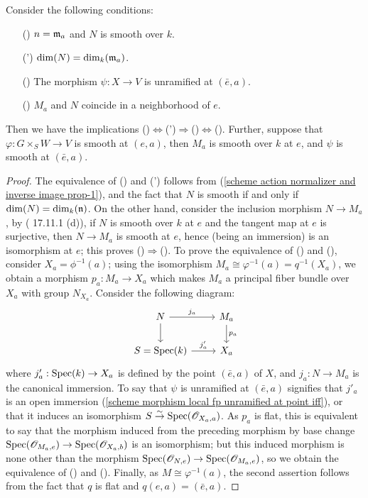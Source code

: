 \begin{lemma}\label{scheme action normalizer and inverse image prop}
Consider the following conditions:
\begin{enumerate}
    \item[(\rmnum{1})] $n=\mathfrak{m}_a$ and $N$ is smooth over $k$.
    \item[(\rmnum{1}')] $\dim(N)=\dim_k(\mathfrak{m}_a)$.
    \item[(\rmnum{2})] The morphism $\psi:X\to V$ is unramified at $(\bar{e},a)$.
    \item[(\rmnum{3})] $M_a$ and $N$ coincide in a neighborhood of $e$.  
\end{enumerate}
Then we have the implications ()$\Leftrightarrow$(')$\Rightarrow$()$\Leftrightarrow$(). Further, suppose that $\varphi:G\times_SW\to V$ is smooth at $(e,a)$, then $M_a$ is smooth over $k$ at $e$, and $\psi$ is smooth at $(\bar{e},a)$.
\end{lemma}
\begin{proof}
The equivalence of () and (') follows from (\ref{scheme action normalizer and inverse image prop-1}), and the fact that $N$ is smooth if and only if $\dim(N)=\dim_k(\mathfrak{n})$. On the other hand, consider the inclusion morphism $N\to M_a$, by (\cite{EGA4-4} 17.11.1 (d)), if $N$ is smooth over $k$ at $e$ and the tangent map at $e$ is surjective, then $N\to M_a$ is smooth at $e$, hence (being an immersion) is an isomorphism at $e$; this proves ()$\Rightarrow$(). To prove the equivalence of () and (), consider $X_a=\phi^{-1}(a)$; using the isomorphism $M_a\cong\varphi^{-1}(a)=q^{-1}(X_a)$, we obtain a morphism $p_a:M_a\to X_a$ which makes $M_a$ a principal fiber bundle over $X_a$ with group $N_{X_a}$. Consider the following diagram:
\[\begin{tikzcd}
N\ar[r,"j_a"]\ar[d]&M_a\ar[d,"p_a"]\\
S=\Spec(k)\ar[r,"j_a'"]&X_a
\end{tikzcd}\]
where $j_a':\mathrm{Spec}(k)\to X_a$ is defined by the point $(\bar{e},a)$ of $X$, and $j_a:N\to M_a$ is the canonical immersion. To say that $\psi$ is unramified at $(\bar{e},a)$ signifies that $j'_a$ is an open immersion (\cref{scheme morphism local fp unramified at point iff}), or that it induces an isomorphism $S\stackrel{\sim}{\to}\mathrm{Spec}(\mathscr{O}_{X_a,a})$. As $p_a$ is flat, this is equivalent to say that the morphism induced from the preceding morphism by base change $\mathrm{Spec}(\mathscr{O}_{M_a,e})\to\mathrm{Spec}(\mathscr{O}_{X_a,b})$ is an isomorphism; but this induced morphism is none other than the morphism $\mathrm{Spec}(\mathscr{O}_{N,e})\to\mathrm{Spec}(\mathscr{O}_{M_a,e})$, so we obtain the equivalence of () and (). Finally, as $M\cong\varphi^{-1}(a)$, the second assertion follows from the fact that $q$ is flat and $q(e,a)=(\bar{e},a)$.
\end{proof}

